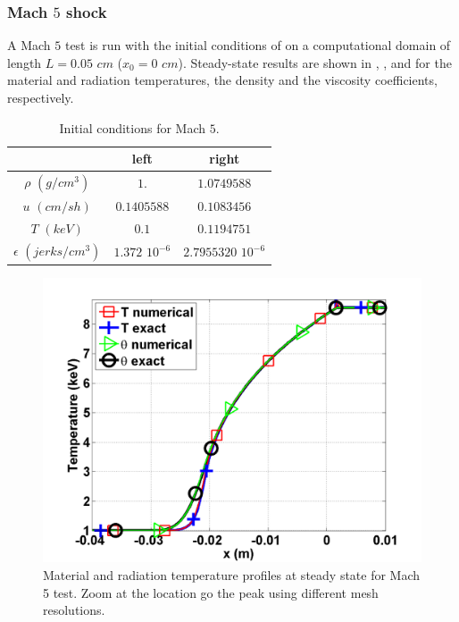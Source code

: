 \subsubsection{Mach $5$ shock}

A Mach $5$ test is run with the initial conditions of  on a computational domain of length $L=0.05$ $cm$ ($x_0 = 0$ $cm$). Steady-state results are shown in , , and  for the material and radiation temperatures, the density and the viscosity coefficients, respectively.
\begin{table}[H]
\caption{\label{tbl:table6} Initial conditions for Mach $5$.}
\begin{center}
\begin{tabular}{|c|c|c|}
\hline 
 & left  & right \\ \hline
$\rho$ $(g/cm^3)$ &$1.$ & $1.0749588$ \\ \hline
$u$ $(cm/sh)$& $0.1405588$ & $0.1083456$ \\ \hline
$T$ $(keV)$& $0.1$ & $0.1194751$\\ \hline
$\epsilon$ $(jerks/cm^3)$ & $1.372$ $10^{-6}$ & $2.7955320$ $10^{-6}$\\
\hline
\end{tabular}  
\end{center}  
\end{table}
\begin{figure}[H]
                \centering
                \includegraphics[width=\textwidth]{figures/Mach_5_nel_1000_temperature.png}
        \caption{Material and radiation temperature profiles at steady state for Mach 5 test. Zoom at the location go the peak using different mesh resolutions.}\label{fig:Mach5_temp}
\end{figure}
